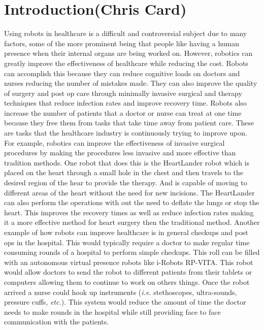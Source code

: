 \documentclass[11pt,conference]{IEEEtran}
\begin{document}
\section{Introduction(Chris Card)}

Using robots in healthcare is a difficult and controversial subject due to many factors, some of the more prominent being that people like having a human presence when their internal organs are being worked on.  However, robotics can greatly improve the effectiveness of healthcare while reducing the cost.  Robots can accomplish this because they can reduce cognitive loads on doctors and nurses reducing the number of 
mistakes made.  They can also improve the quality of surgery and post op care through minimally invasive surgical and therapy techniques that reduce infection rates and improve recovery time.  Robots also increase the number of patients that a doctor or nurse can treat at one time because they free them from tasks that take time away from patient care.  These are tasks that the healthcare industry is continuously trying to improve upon.
\newline
\indent For example, robotics can improve the effectiveness of invasive surgical procedures by making the procedures less invasive and more effective than tradition methods.  One robot that does this is the HeartLander robot which is placed on the heart through a small hole in 
the chest and then travels to the desired region of the hear to provide the therapy. And is capable of moving to different areas of the heart without the need for new incisions.  The HeartLander can also perform the 
operations with out the need to deflate the lungs or stop the heart.  This improves the recovery times as well as reduce infection rates making it a more effective method for heart surgery then the traditional method.  
\newline
\indent Another example of how robots can improve healthcare is in general checkups and post ops in the hospital.  This would typically require a doctor to make regular time consuming rounds of a hospital to perform simple checkups.  This roll can be filled with an autonomous virtual presence robots like i-Robots RP-VITA.  This robot would allow doctors to send the robot to different patients from their tablets or computers allowing them to continue to work on others things.  Once the robot arrived a nurse could hook up instruments (\textit{i.e.} stethoscopes, ultra-sounds, pressure cuffs, \textit{etc.}).  This system would reduce the amount of time the doctor needs to make rounds in the hospital while still providing face to face communication with the patients.
\end{document}
